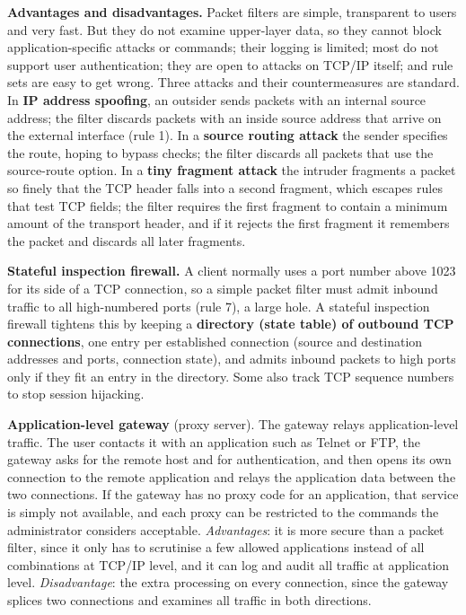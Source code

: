 \textbf{Advantages and disadvantages.} Packet filters are simple, transparent to users and very fast. But they do not examine upper-layer data, so they cannot block application-specific attacks or commands; their logging is limited; most do not support user authentication; they are open to attacks on TCP/IP itself; and rule sets are easy to get wrong. Three attacks and their countermeasures are standard. In \textbf{IP address spoofing}, an outsider sends packets with an internal source address; the filter discards packets with an inside source address that arrive on the external interface (rule 1). In a \textbf{source routing attack} the sender specifies the route, hoping to bypass checks; the filter discards all packets that use the source-route option. In a \textbf{tiny fragment attack} the intruder fragments a packet so finely that the TCP header falls into a second fragment, which escapes rules that test TCP fields; the filter requires the first fragment to contain a minimum amount of the transport header, and if it rejects the first fragment it remembers the packet and discards all later fragments.

\textbf{Stateful inspection firewall.} A client normally uses a port number above 1023 for its side of a TCP connection, so a simple packet filter must admit inbound traffic to all high-numbered ports (rule 7), a large hole. A stateful inspection firewall tightens this by keeping a \textbf{directory (state table) of outbound TCP connections}, one entry per established connection (source and destination addresses and ports, connection state), and admits inbound packets to high ports only if they fit an entry in the directory. Some also track TCP sequence numbers to stop session hijacking.

\textbf{Application-level gateway} (proxy server). The gateway relays application-level traffic. The user contacts it with an application such as Telnet or FTP, the gateway asks for the remote host and for authentication, and then opens its own connection to the remote application and relays the application data between the two connections. If the gateway has no proxy code for an application, that service is simply not available, and each proxy can be restricted to the commands the administrator considers acceptable. \emph{Advantages}: it is more secure than a packet filter, since it only has to scrutinise a few allowed applications instead of all combinations at TCP/IP level, and it can log and audit all traffic at application level. \emph{Disadvantage}: the extra processing on every connection, since the gateway splices two connections and examines all traffic in both directions.

